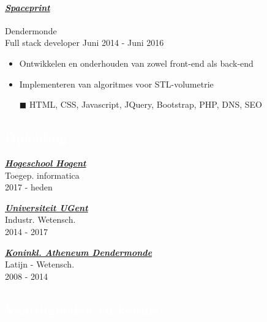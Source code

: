 \documentclass[a4paper, twoside]{article}
\begin{document}
\paragraph{\textbf{\textit{\href{https:// }{\textcolor{blueDark}{ Spaceprint }}}}} \hfill\small Dendermonde \\
Full stack developer \hfill\small
Juni 2014
- Juni 2016
\begin{itemize}
\itemsep-0.2em
\item Ontwikkelen en onderhouden van zowel front-end als back-end
\item Implementeren van algoritmes voor STL-volumetrie
\item[\color{orange}$\blacksquare$] HTML, CSS, Javascript, JQuery, Bootstrap, PHP, DNS, SEO
\end{itemize}
\begin{mdframed}
\section*{\textcolor{white}{ Opleiding }}
\end{mdframed}
\begin{multicols}{ 3 }
\setlength{\parindent}{0pt}
\par
\textbf{\textit{\href{https://hogent.be }{\textcolor{blueDark}{ Hogeschool Hogent }}}}\\
Toegep. informatica\\ \small 2017 - heden
\setlength{\parindent}{0pt}
\par
\textbf{\textit{\href{https://ugent.be }{\textcolor{blueDark}{ Universiteit UGent }}}}\\
Industr. Wetensch.\\ \small 2014 - 2017
\setlength{\parindent}{0pt}
\par
\textbf{\textit{\href{https://kad.be }{\textcolor{blueDark}{ Koninkl. Atheneum Dendermonde }}}}\\
Latijn - Wetensch.\\ \small 2008 - 2014
\end{multicols}
\newpage
\begin{mdframed}
\section*{\textcolor{white}{ Vaardigheden en kennis }}
\end{mdframed}
\noindent
\end{document}
